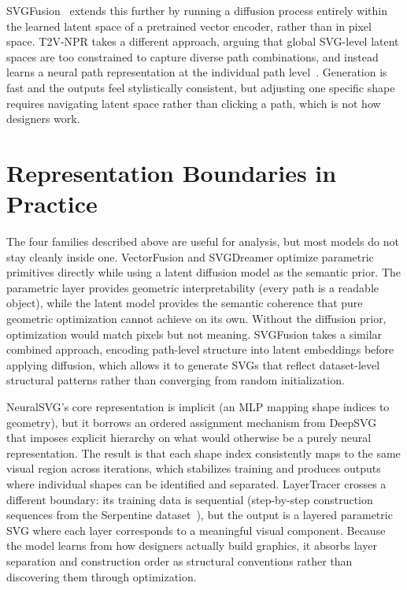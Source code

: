 SVGFusion~\cite{xingSVGFusionScalableTexttoSVG2025} extends this 
further by running a diffusion process entirely within the learned 
latent space of a pretrained vector encoder, rather than in pixel 
space. T2V-NPR takes a different approach, arguing that global 
SVG-level latent spaces are too constrained to capture diverse 
path combinations, and instead learns a neural path representation 
at the individual path 
level~\cite{zhangTexttoVectorGenerationNeural2024}. Generation is 
fast and the outputs feel stylistically consistent, but adjusting 
one specific shape requires navigating latent space rather than 
clicking a path, which is not how designers work.


\section{Representation Boundaries in Practice}
\label{sec:hybrid}

The four families described above are useful for analysis, but 
most models do not stay cleanly inside one. VectorFusion and 
SVGDreamer optimize parametric primitives directly while using 
a latent diffusion model as the semantic prior. The parametric 
layer provides geometric interpretability (every path is a 
readable object), while the latent model provides the semantic 
coherence that pure geometric optimization cannot achieve on 
its own. Without the diffusion prior, optimization would 
match pixels but not meaning. SVGFusion takes a similar 
combined approach, encoding path-level structure into latent 
embeddings before applying diffusion, which allows it to 
generate SVGs that reflect dataset-level structural patterns 
rather than converging from random initialization.

NeuralSVG's core representation is implicit (an MLP mapping 
shape indices to geometry), but it borrows an ordered 
assignment mechanism from 
DeepSVG~\cite{polaczekNeuralSVGImplicitRepresentation2025} 
that imposes explicit hierarchy on what would otherwise be a 
purely neural representation. The result is that each shape 
index consistently maps to the same visual region across 
iterations, which stabilizes training and produces 
outputs where individual shapes can be identified and 
separated. LayerTracer crosses a different boundary: its 
training data is sequential (step-by-step construction 
sequences from the Serpentine 
dataset~\cite{songLayerTracerCognitiveAlignedLayered2025}), 
but the output is a layered parametric SVG where each layer 
corresponds to a meaningful visual component. Because the 
model learns from how designers actually build graphics, it 
absorbs layer separation and construction order as structural 
conventions rather than discovering them through optimization.


